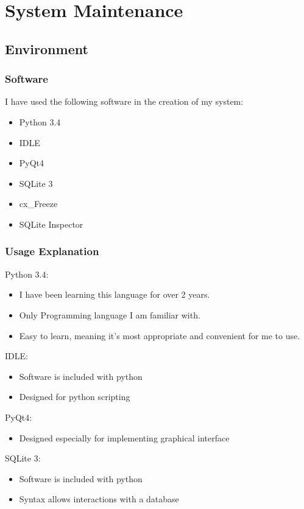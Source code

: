 \chapter{System Maintenance}

\section{Environment}

\subsection{Software}

I have used the following software in the creation of my system:

\begin{itemize}
    \item Python 3.4
    \item IDLE
    \item PyQt4
    \item SQLite 3
    \item cx_Freeze
    \item SQLite Inspector
\end{itemize}

\subsection{Usage Explanation}

Python 3.4:
\begin{itemize}
    \item I have been learning this language for over 2 years.
    \item Only Programming language I am familiar with.
    \item Easy to learn, meaning it's most appropriate and convenient for me to use.
\end{itemize}


IDLE:
\begin{itemize}
    \item Software is included with python
    \item Designed for python scripting
\end{itemize}


PyQt4:
\begin{itemize}
    \item Designed especially for implementing graphical interface
\end{itemize}


SQLite 3:
\begin{itemize}
    \item Software is included with python	
    \item Syntax allows interactions with a database
\end{itemize}


